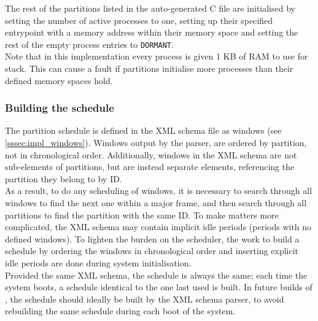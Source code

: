 The rest of the partitions listed in the auto-generated C file are initialised
by setting the number of active processes to one, setting up their specified
entrypoint with a memory address within their memory space and setting the rest
of the empty process entries to \texttt{DORMANT}.\\

Note that in this implementation every process is given 1 KB of RAM to use for
stack. This can cause a fault if partitions initialise more processes than
their defined memory spaces hold.


\subsubsection{Building the schedule}
\label{sssec:schedule_building}
The partition schedule is defined in the XML schema file as windows (see
\ref{sssec:impl_windows}). Windows output by the parser, are ordered by partition, not in chronological order.
Additionally, windows in the XML schema are not sub-elements of partitions, but
are instead separate elements, referencing the partition they belong to by ID.\\

As a result, to do any scheduling of windows, it is necessary to search through
all windows to find the next one within a major frame, and then search through
all partitions to find the partition with the same ID. To make matters more
complicated, the XML schema may contain implicit idle periods (periods with no
defined windows). To lighten the burden on the scheduler, the work to build a
schedule by ordering the windows in chronological order and inserting explicit idle
periods are done during system initialisation.\\

Provided the same XML schema, the schedule is always the same; each time
the system boots, a schedule identical to the one last used is built.
In future builds of \OSname{}, the schedule should ideally be built by the XML
schema parser, to avoid rebuilding the same schedule during each boot of the
system.


